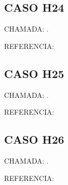 \documentclass{undftex}
\begin{document}
\begin{refsection}\section*{CASO H24} CHAMADA: . \textcite{H24a}\par REFERENCIA:\par\printbibliography[heading=none,check=undfconsultadas]\end{refsection}\clearpage
\begin{refsection}\section*{CASO H25} CHAMADA: . \textcite{H25a}\par REFERENCIA:\par\printbibliography[heading=none,check=undfconsultadas]\end{refsection}\clearpage
\begin{refsection}\section*{CASO H26} CHAMADA: . \textcite{H26a}\par REFERENCIA:\par\printbibliography[heading=none,check=undfconsultadas]\end{refsection}\clearpage
\end{document}
